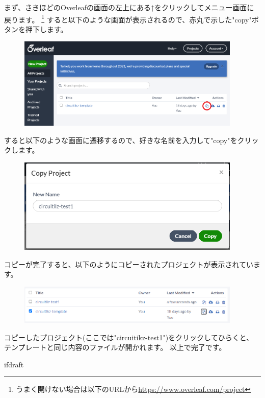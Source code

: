 		まず、さきほどのOverleafの画面の左上にある↑をクリックしてメニュー画面に戻ります。
		\footnote{うまく開けない場合は以下のURLから\url{https://www.overleaf.com/project}}
		すると以下のような画面が表示されるので、赤丸で示した"copy"ボタンを押下します。
		\begin{figure}[H]
			\includegraphics[width=0.95\textwidth]{overleaf-menu.png}
		\end{figure}\noindent
		すると以下のような画面に遷移するので、好きな名前を入力して"copy"をクリックします。
		\begin{figure}[H]
			\includegraphics[width=0.95\textwidth]{overleaf-menu-copy.png}
		\end{figure}\noindent
		コピーが完了すると、以下のようにコピーされたプロジェクトが表示されています。
		\begin{figure}[H]
			\includegraphics[width=0.95\textwidth]{overleaf-menu-copied.png}	
		\end{figure}\noindent
		コピーしたプロジェクト(ここでは"circuitikz-test1")をクリックしてひらくと、
		テンプレートと同じ内容のファイルが開かれます。
		以上で完了です。
		
		\expandafter\ifx\csname ifdraft\endcsname\relax

\fi
